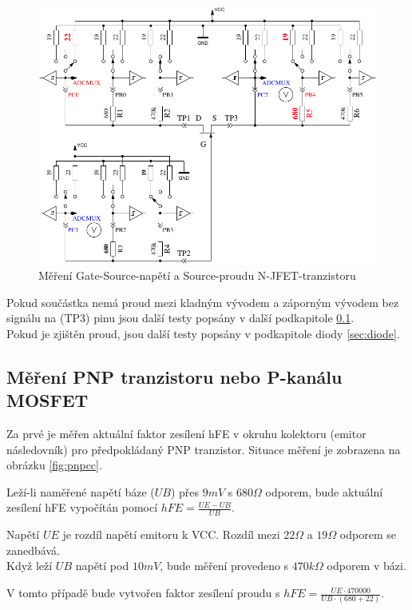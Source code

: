 \begin{figure}[H]
\centering
\includegraphics[]{../FIG/JFETcd.pdf}
\caption{Měření Gate-Source-napětí a Source-proudu N-JFET-tranzistoru}
\label{fig:JFETcd}
\end{figure}

Pokud součástka nemá proud mezi kladným vývodem a záporným vývodem bez signálu
na (TP3) pinu jsou další testy popsány v další podkapitole \ref{sec:pnp}.\\
Pokud je zjištěn proud, jsou další testy popsány v podkapitole diody \ref{sec:diode}.

\subsection{Měření PNP tranzistoru nebo P-kanálu MOSFET}
\label{sec:pnp}
Za prvé je měřen aktuální faktor zesílení hFE v okruhu kolektoru (emitor následovník) pro předpokládaný
PNP tranzistor.
Situace měření je zobrazena na obrázku \ref{fig:pnpcc}.

Leží-li naměřené napětí báze (\(UB\)) přes \(9mV\) s \(680\Omega\) odporem,
bude aktuální zesílení hFE vypočítán pomocí \(hFE = \frac{UE-UB}{UB}\).

Napětí \(UE\) je rozdíl napětí emitoru k VCC. Rozdíl mezi \(22\Omega\) a \(19\Omega\) odporem se zanedbává.
\\Když leží \(UB\) napětí pod \(10mV\), bude měření provedeno s \(470k\Omega\) odporem v bázi.

V tomto případě bude vytvořen faktor zesílení proudu s \(hFE = \frac{UE \cdot 470000}{UB \cdot (680+22)}\).

